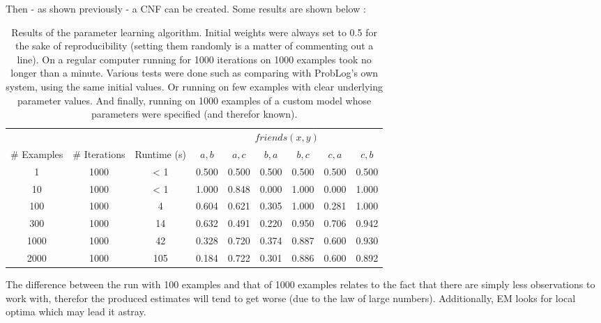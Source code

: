 \par\noindent Then - as shown previously - a CNF can be created. Some results are shown below :

\begin{table}[h]
\centering
\begin{tabular}{ccc|cccccc}
& & & \multicolumn{6}{c}{$friends(x,y)$}\\
\# Examples & \# Iterations & Runtime (s) & $a,b$ & $a,c$ & $b,a$ & $b,c$ & $c,a$ & $c,b$\\\hline
1 & 1000 & < 1 & 0.500 & 0.500 & 0.500 & 0.500 & 0.500 & 0.500 \\
10 & 1000 & < 1 & 1.000 & 0.848 & 0.000 & 1.000 & 0.000 & 1.000 \\
100 & 1000 & 4 & 0.604 & 0.621 & 0.305 & 1.000 & 0.281 & 1.000 \\
300 & 1000 & 14 & 0.632 & 0.491 & 0.220 & 0.950 & 0.706 & 0.942 \\
1000 & 1000 & 42 & 0.328 & 0.720 & 0.374 & 0.887 & 0.600 & 0.930 \\
2000 & 1000 & 105 & 0.184 & 0.722 & 0.301 & 0.886 & 0.600 & 0.892 \\
\end{tabular}
\caption{Results of the parameter learning algorithm. Initial weights were always set to 0.5 for the sake of reproducibility (setting them randomly is a matter of commenting out a line). On a regular computer running for 1000 iterations on 1000 examples took no longer than a minute. Various tests were done such as comparing with ProbLog's own system, using the same initial values. Or running on few examples with clear underlying parameter values. And finally, running on 1000 examples of a custom model whose parameters were specified (and therefor known).}
\label{plres}
\end{table}

\noindent The difference between the run with 100 examples and that of 1000 examples relates to the fact that there are simply less observations to work with, therefor the produced estimates will tend to get worse (due to the law of large numbers). Additionally, EM looks for local optima which may lead it astray.